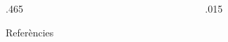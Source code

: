 \begin{frame}[t]
\begin{columns}[t]
\begin{column}{.465\textwidth}
\begin{block}{Referències}
\end{block}


\end{column} %

\begin{column}{.015\textwidth}\end{column} %

\end{columns} %

\end{frame} %

